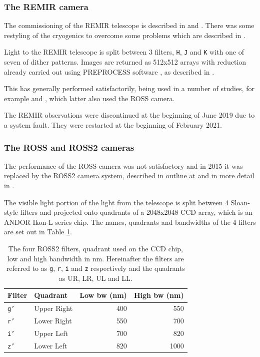 \subsubsection{The REMIR camera}

The commissioning of the REMIR telescope is described in \citet{conconi04} and
\citet{vitali03}. There was some restyling of the cryogenics to overcome some
problems which are described in \citet{vitali06}.

Light to the REMIR telescope is split between 3 filters, \texttt{H}, \texttt{J}
and \texttt{K} with one of seven of dither patterns. Images are returned as
512x512 arrays with reduction already carried out using PREPROCESS software
\citep{dipaola01}, as described in \citet{calzoletti05}.

This has generally performed satisfactorily, being used in a number of studies,
for example \citet{dammando11} and  \citet{davanzo06}, which latter also used the ROSS camera.

The REMIR observations were discontinued at the beginning of June 2019 due to a
system fault. They were restarted at the beginning of February 2021.

\subsubsection{The ROSS and ROSS2 cameras}

The performance of the ROSS camera was not satisfactory and in 2015 it
was replaced by the ROSS2 camera system, described in outline at
\citet{reminaf7} and in more detail in \citet{molinari14}.

The visible light portion of the light from the telescope is split between 4
Sloan-style filters and projected onto quadrants of a 2048x2048 CCD array, which
is an ANDOR Ikon-L series chip. The names, quadrants and bandwidths of the 4
filters are set out in Table \ref{table:ros2quad}.

\begin{table}[!htbp]
\begin{center}
\begin{tabular}{llrr} \hline
Filter & Quadrant & Low bw (nm) & High bw (nm) \\\hline
\texttt{g'} & Upper Right & 400 & 550 \\
\texttt{r'} & Lower Right & 550 & 700 \\
\texttt{i'} & Upper Left & 700 & 820 \\
\texttt{z'} & Lower Left & 820 & 1000 \\
\hline
\end{tabular}
\end{center}
\caption{The four ROSS2 filters, quadrant used on the CCD chip, low and high
bandwidth in nm. Hereinafter the filters are referred to as \texttt{g},
\texttt{r}, \texttt{i} and \texttt{z} respectively and the quadrants as UR, LR,
UL and LL.} \protect\label{table:ros2quad}
\end{table}


